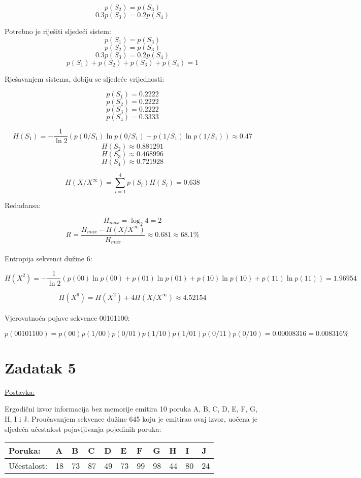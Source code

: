\documentclass[12pt]{article}
\begin{document}
$$p(S_2) = p(S_3)$$
$$0.3 p(S_3) = 0.2 p(S_4)$$

Potrebno je riješiti sljedeći sistem:
$$p(S_1) = p(S_3)$$
$$p(S_2) = p(S_3)$$
$$0.3 p(S_3) = 0.2 p(S_4)$$
$$p(S_1) + p(S_2)  + p(S_3) + p(S_4) = 1$$

Rješavanjem sistema, dobiju se sljedeće vrijednosti:

$$p(S_1) = 0.2222$$
$$p(S_2) = 0.2222$$
$$p(S_3) = 0.2222$$
$$p(S_4) = 0.3333$$

$$H(S_1) = - \frac{1}{\ln{2}} (p(0/S_1) \ln{p(0/S_1)} + p(1/S_1) \ln{p(1/S_1)}) \approx 0.47$$
$$H(S_2) \approx 0.881291$$
$$H(S_3) \approx 0.468996$$
$$H(S_4) \approx 0.721928$$

$$H(X/X^{\infty}) = \sum_{i = 1}^{4} p(S_i) H(S_i) = 0.638$$

Redudansa:

$$H_{max} = \log_{2}4 = 2$$
$$R = \frac{H_{max} - H(X/X^{\infty})}{H_{max}} \approx 0.681 \approx 68.1 \%$$ \\

Entropija sekvenci dužine 6:

$$H(X^2) = - \frac{1}{\ln{2}} (p(00) \ln{p(00)} + p(01) \ln{p(01)} + p(10) \ln{p(10)} + p(11) \ln{p(11)}) = 1.96954$$

$$H(X^6) = H(X^2) + 4  H(X/X^{\infty}) \approx 4.52154$$\\

Vjerovatnoća pojave sekvence 00101100:

$$p(00101100) = p(00) p(1/00)p(0/01)p(1/10)p(1/01)p(0/11)p(0/10) = 0.00008316 = 0.008316\%$$


\newpage

\section*{Zadatak 5\label{Z5}}

\underline{Postavka:}

Ergodični izvor informacija bez memorije emitira 10 poruka A, B, C, D, E, F, G, H, I i J. Proučavanjem sekvence dužine 645 koju je emitirao ovaj izvor, uočena je sljedeća učestalost pojavljivanja pojedinih poruka: 

\begin{table}[hp]
\centering
\begin{tabular}{|l|l|l|l|l|l|l|l|l|l|l|}
\hline
Poruka:     & A  & B  & C  & D  & E  & F  & G  & H  & I  & J  \\ \hline
Učestalost: & 18 & 73 & 87 & 49 & 73 & 99 & 98 & 44 & 80 & 24 \\ \hline
\end{tabular}
\end{table}
\end{document}
